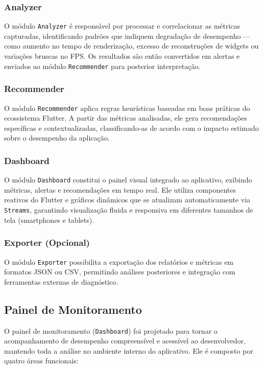\documentclass[12pt,a4paper,oneside]{abntex2}
\begin{document}
\subsubsection{Analyzer}
O módulo \texttt{Analyzer} é responsável por processar e correlacionar as métricas capturadas, identificando padrões que indiquem degradação de desempenho — como aumento no tempo de renderização, excesso de reconstruções de widgets ou variações bruscas no FPS.  
Os resultados são então convertidos em alertas e enviados ao módulo \texttt{Recommender} para posterior interpretação.

\subsubsection{Recommender}
O módulo \texttt{Recommender} aplica regras heurísticas baseadas em boas práticas do ecossistema Flutter. A partir das métricas analisadas, ele gera recomendações específicas e contextualizadas, classificando-as de acordo com o impacto estimado sobre o desempenho da aplicação.

\subsubsection{Dashboard}
O módulo \texttt{Dashboard} constitui o painel visual integrado ao aplicativo, exibindo métricas, alertas e recomendações em tempo real.  
Ele utiliza componentes reativos do Flutter e gráficos dinâmicos que se atualizam automaticamente via \texttt{Streams}, garantindo visualização fluida e responsiva em diferentes tamanhos de tela (smartphones e tablets).

\subsubsection{Exporter (Opcional)}
O módulo \texttt{Exporter} possibilita a exportação dos relatórios e métricas em formatos JSON ou CSV, permitindo análises posteriores e integração com ferramentas externas de diagnóstico.

\subsection{Painel de Monitoramento}

O painel de monitoramento (\texttt{Dashboard}) foi projetado para tornar o acompanhamento de desempenho compreensível e acessível ao desenvolvedor, mantendo toda a análise no ambiente interno do aplicativo.  
Ele é composto por quatro áreas funcionais:
\end{document}
